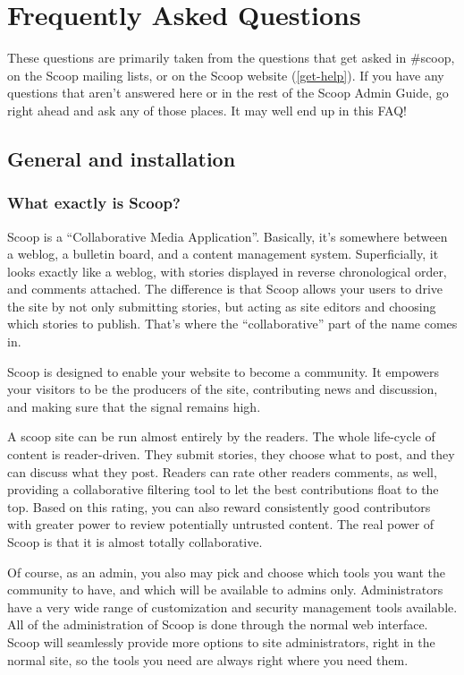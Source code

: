 \section{Frequently Asked Questions}
\label{faq}

These questions are primarily taken from the questions that get asked in \#scoop, on the Scoop mailing lists, or on the Scoop website (\ref{get-help}).  If you have any questions that aren't answered here or in the rest of the Scoop Admin Guide, go right ahead and ask any of those places.  It may well end up in this FAQ!

\subsection{General and installation}

\subsubsection{What exactly is Scoop?}

Scoop is a ``Collaborative Media Application''. Basically, it's somewhere between a weblog, a bulletin board, and a content management system. Superficially, it looks exactly like a weblog, with stories displayed in reverse chronological order, and comments attached. The difference is that Scoop allows your users to drive the site by not only submitting stories, but acting as site editors and choosing which stories to publish. That's where the ``collaborative'' part of the name comes in.

Scoop is designed to enable your website to become a community. It empowers your visitors to be the producers of the site, contributing news and discussion, and making sure that the signal remains high.

A scoop site can be run almost entirely by the readers. The whole life-cycle of content is reader-driven. They submit stories, they choose what to post, and they can discuss what they post. Readers can rate other readers comments, as well, providing a collaborative filtering tool to let the best contributions float to the top. Based on this rating, you can also reward consistently good contributors with greater power to review potentially untrusted content. The real power of Scoop is that it is almost totally collaborative.

Of course, as an admin, you also may pick and choose which tools you want the community to have, and which will be available to admins only. Administrators have a very wide range of customization and security management tools available. All of the administration of Scoop is done through the normal web interface. Scoop will seamlessly provide more options to site administrators, right in the normal site, so the tools you need are always right where you need them.

